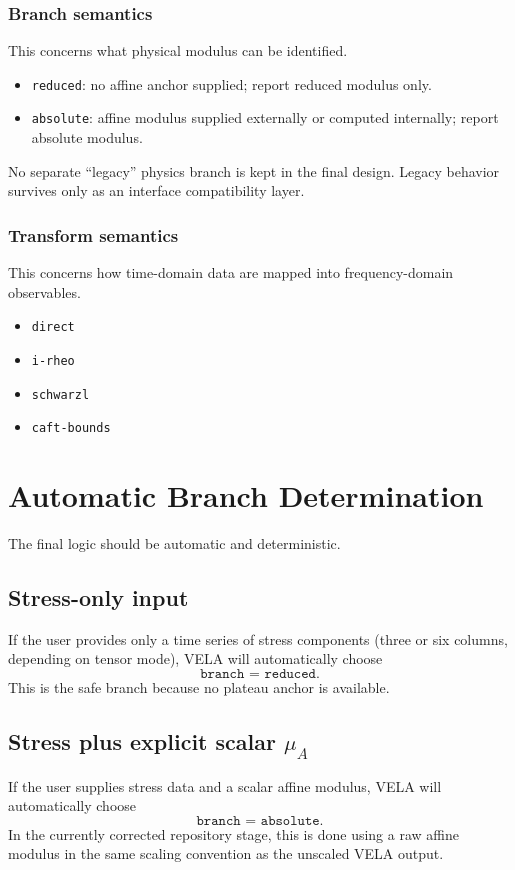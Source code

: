 \documentclass[11pt]{article}
\begin{document}
\subsubsection*{Branch semantics}
This concerns what physical modulus can be identified.
\begin{itemize}[leftmargin=2em]
  \item \texttt{reduced}: no affine anchor supplied; report reduced modulus only.
  \item \texttt{absolute}: affine modulus supplied externally or computed internally; report absolute modulus.
\end{itemize}
No separate ``legacy'' physics branch is kept in the final design. Legacy behavior survives only as an interface compatibility layer.

\subsubsection*{Transform semantics}
This concerns how time-domain data are mapped into frequency-domain observables.
\begin{itemize}[leftmargin=2em]
  \item \texttt{direct}
  \item \texttt{i-rheo}
  \item \texttt{schwarzl}
  \item \texttt{caft-bounds}
\end{itemize}

\section{Automatic Branch Determination}

The final logic should be automatic and deterministic.

\subsection{Stress-only input}
If the user provides only a time series of stress components (three or six columns, depending on tensor mode), VELA will automatically choose
\begin{equation}
\texttt{branch = reduced}.
\end{equation}
This is the safe branch because no plateau anchor is available.

\subsection{Stress plus explicit scalar $\mu_A$}
If the user supplies stress data and a scalar affine modulus, VELA will automatically choose
\begin{equation}
\texttt{branch = absolute}.
\end{equation}
In the currently corrected repository stage, this is done using a raw affine modulus in the same scaling convention as the unscaled VELA output.
\end{document}

